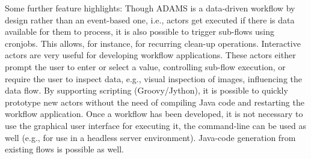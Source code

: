 \documentclass[a4paper,10pt]{article}
\begin{document}
Some further feature highlights: Though ADAMS is a data-driven workflow by design rather than an event-based one, i.e., actors get executed if there is data available for them to process, it is also possible to trigger sub-flows using cronjobs. This allows, for instance, for recurring clean-up operations. Interactive actors are very useful for developing workflow applications. These actors either prompt the user to enter or select a value, controlling sub-flow execution, or require the user to inspect data, e.g., visual inspection of images, influencing the data flow. By supporting scripting (Groovy/Jython), it is possible to quickly prototype new actors without the need of compiling Java code and restarting the workflow application. Once a workflow has been developed, it is not necessary to use the graphical user interface for executing it, the command-line can be used as well (e.g., for use in a headless server environment). Java-code generation from existing flows is possible as well.
\end{document}
